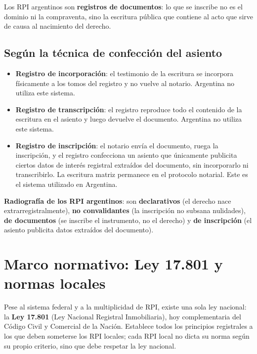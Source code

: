 \documentclass[12pt,oneside]{book}
\begin{document}
Los RPI argentinos son \textbf{registros de documentos}: lo que se inscribe no es el dominio ni la compraventa, sino la escritura pública que contiene al acto que sirve de causa al nacimiento del derecho.

\subsection{Según la técnica de confección del asiento}

\begin{itemize}
    \item \textbf{Registro de incorporación}: el testimonio de la escritura se incorpora físicamente a los tomos del registro y no vuelve al notario. Argentina no utiliza este sistema.
    \item \textbf{Registro de transcripción}: el registro reproduce todo el contenido de la escritura en el asiento y luego devuelve el documento. Argentina no utiliza este sistema.
    \item \textbf{Registro de inscripción}: el notario envía el documento, ruega la inscripción, y el registro confecciona un asiento que únicamente publicita ciertos datos de interés registral extraídos del documento, sin incorporarlo ni transcribirlo. La escritura matriz permanece en el protocolo notarial. Este es el sistema utilizado en Argentina.
\end{itemize}

\begin{important}
\textbf{Radiografía de los RPI argentinos}: son \textbf{declarativos} (el derecho nace extrarregistralmente), \textbf{no convalidantes} (la inscripción no subsana nulidades), \textbf{de documentos} (se inscribe el instrumento, no el derecho) y \textbf{de inscripción} (el asiento publicita datos extraídos del documento).
\end{important}

\section{Marco normativo: Ley 17.801 y normas locales}

Pese al sistema federal y a la multiplicidad de RPI, existe una sola ley nacional: la \textbf{Ley 17.801} (Ley Nacional Registral Inmobiliaria), hoy complementaria del Código Civil y Comercial de la Nación. Establece todos los principios registrales a los que deben someterse los RPI locales; cada RPI local no dicta su norma según su propio criterio, sino que debe respetar la ley nacional.
\end{document}
